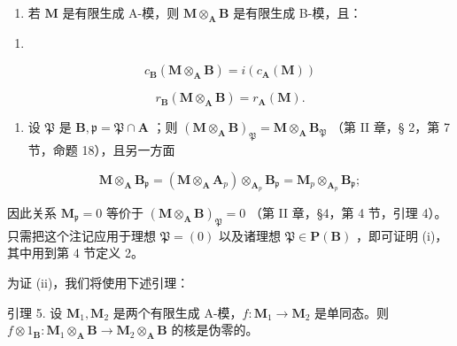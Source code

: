 \begin{enumerate}
\def\labelenumi{(\roman{enumi})}
\setcounter{enumi}{2}
\tightlist
\item
  若 \(\mathbf{M}\) 是有限生成 A-模，则 \(\mathbf{M} \otimes_{\mathbf{A}} \mathbf{B}\) 是有限生成 B-模，且：
\end{enumerate}

\begin{enumerate}
\def\labelenumi{(\arabic{enumi})}
\setcounter{enumi}{22}
\tightlist
\item
\end{enumerate}

\[
c _ {\mathbf {B}} (\mathbf {M} \otimes_ {\mathbf {A}} \mathbf {B}) = i (c _ {\mathbf {A}} (\mathbf {M}))\tag{24}
\]

\[
r _ {\mathbf {B}} (\mathbf {M} \otimes_ {\mathbf {A}} \mathbf {B}) = r _ {\mathbf {A}} (\mathbf {M}).
\]

\begin{enumerate}
\def\labelenumi{(\roman{enumi})}
\tightlist
\item
  设 \(\mathfrak{P}\) 是 \(\mathbf{B},\mathfrak{p} = \mathfrak{P}\cap \mathbf{A}\) ；则 \((\mathbf{M}\otimes_{\mathbf{A}}\mathbf{B})_{\mathfrak{P}} = \mathbf{M}\otimes_{\mathbf{A}}\mathbf{B}_{\mathfrak{P}}\) （第 II 章，§ 2，第 7 节，命题 18），且另一方面
\end{enumerate}

\[
\mathbf {M} \otimes_ {\mathbf {A}} \mathbf {B} _ {\mathfrak {p}} = (\mathbf {M} \otimes_ {\mathbf {A}} \mathbf {A} _ {p}) \otimes_ {\mathbf {A} _ {p}} \mathbf {B} _ {\mathfrak {p}} = \mathbf {M} _ {p} \otimes_ {\mathbf {A} _ {p}} \mathbf {B} _ {\mathfrak {p}};
\]

因此关系 \(\mathbf{M}_{\mathfrak{p}} = 0\) 等价于 \((\mathbf{M} \otimes_{\mathbf{A}} \mathbf{B})_{\mathfrak{P}} = 0\) （第 II 章，§4，第 4 节，引理 4）。只需把这个注记应用于理想 \(\mathfrak{P} = (0)\) 以及诸理想 \(\mathfrak{P} \in \mathbf{P}(\mathbf{B})\) ，即可证明 (i)，其中用到第 4 节定义 2。

为证 (ii)，我们将使用下述引理：

引理 5. 设 \(\mathbf{M}_1, \mathbf{M}_2\) 是两个有限生成 A-模，\(f: \mathbf{M}_1 \to \mathbf{M}_2\) 是单同态。则 \(f \otimes 1_{\mathbf{B}}: \mathbf{M}_1 \otimes_{\mathbf{A}} \mathbf{B} \to \mathbf{M}_2 \otimes_{\mathbf{A}} \mathbf{B}\) 的核是伪零的。

